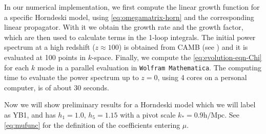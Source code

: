 In our numerical implementation, we first compute the linear growth function for a specific Horndeski
model, using \cref{eq:omegamatrix-horn} and the corresponding linear propagator. 
With it we
obtain the growth rate and the growth factor, which are then used
to calculate terms in the 1-loop integrals.
The initial power spectrum at a high redshift ($z \approx 100$)
is obtained from CAMB (see \cite{lewis_efficient_2000})
and it is evaluated
at 100 points in $k$-space. 
Finally, we compute the \ref{eq:evolution-eqn-Chi} for each $k$ mode
in  a parallel evaluation in \texttt{Wolfram Mathematica}. 
The computing time to evaluate the power spectrum up to $z=0$,
using 4 cores on a personal computer, is of about
30 seconds.

Now we will show preliminary results for a Horndeski model which we will label as YB1, and
has $h_1 = 1.0$, $h_5 = 1.15$ with a pivot scale $k_{*} = 0.9 \textrm{h/Mpc}$. See \cref{eq:mufunc} for the definition of the coefficients
entering $\mu$.


